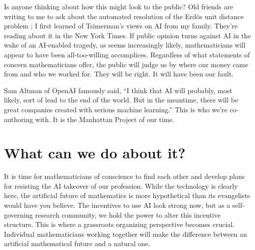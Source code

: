 \documentclass[12pt]{amsart}
\theoremstyle{definition}
\begin{document}
Is anyone thinking about how this might look to the public? Old friends are writing to me to ask about the automated resolution of the Erd\"os unit distance problem \cite{nytcaution}; I first learned of Tsimerman's views on AI from my family. They're reading about it in the New York Times. 
If public opinion turns against AI in the wake of an AI-enabled tragedy, as seems increasingly likely, mathematicians will appear to have been all-too-willing accomplices. Regardless of what statements of concern mathematicians offer, the public will judge us by where our money came from and who we worked for. They will be right. It will have been our fault.

Sam Altman of OpenAI famously said, ``I think that AI will probably, most likely, sort of lead to the end of the world. But in the meantime, there will be great companies created with serious machine learning.'' This is who we're co-authoring with. It is the Manhattan Project of our time.




\section{What can we do about it?}

It is time for mathematicians of conscience to find each other and develop plans for resisting the AI takeover of our profession. While the technology is clearly here, the artificial future of mathematics is more hypothetical than its evangelists would have you believe. The incentives to use AI look strong now, but as a self-governing research community, we hold the power to alter this incentive structure. This is where a grassroots organizing perspective becomes crucial. Individual mathematicians working together will make the difference between an artificial mathematical future and a natural one.
\end{document}

